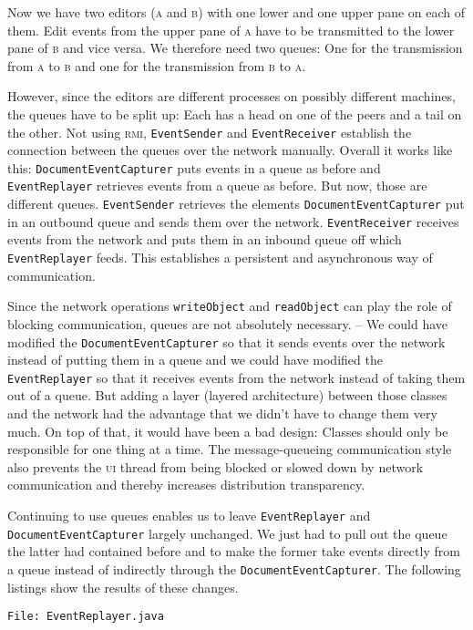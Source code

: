 \documentclass[a4paper,draft,12pt,oneside,article,table]{memoir}
\newcommand{\srcpath}{../ex09/src/main/java/ddist}
\newcommand{\inmnt}[3]{\vspace{1em}\noindent\texttt{\color{gray}File: #3}\vspace{-1em}\inputminted[tabsize=4,firstline=#1,firstnumber=#1,lastline=#2,linenos]{java}{\srcpath/#3}}
\newcommand{\mil}[1]{\texttt{#1}}
\begin{document}
Now we have two editors (\textsc{a} and \textsc{b}) with one lower and
one upper pane on each of them. Edit events from the upper pane of
\textsc{a} have to be transmitted to the lower pane of \textsc{b} and
vice versa. We therefore need two queues: One for the transmission
from \textsc{a} to \textsc{b} and one for the transmission from
\textsc{b} to \textsc{a}.

However, since the editors are different processes on possibly
different machines, the queues have to be split up: Each has a head on
one of the peers and a tail on the other.  Not using \textsc{rmi},
\mil{EventSender} and \mil{EventReceiver} establish the connection
between the queues over the network manually. Overall it works like
this: \mil{DocumentEventCapturer} puts events in a queue as before and
\mil{EventReplayer} retrieves events from a queue as before. But
now, those are different queues.  \mil{EventSender} retrieves the
elements \mil{DocumentEventCapturer} put in an outbound queue and
sends them over the network.  \mil{EventReceiver} receives events from
the network and puts them in an inbound queue off which
\mil{EventReplayer} feeds. This establishes a persistent and
asynchronous way of communication.

Since the network operations \mil{writeObject} and \mil{readObject} can
play the role of blocking communication, queues are not absolutely
necessary. -- We could have modified the \mil{DocumentEventCapturer} so
that it sends events over the network instead of putting them in a queue
and we could have modified the \mil{EventReplayer} so that it receives
events from the network instead of taking them out of a queue. But
adding a layer (layered architecture) between those classes and the
network had the advantage that we didn't have to change them very much.
On top of that, it would have been a bad design: Classes should only be
responsible for one thing at a time. The message-queueing communication
style also prevents the \textsc{ui} thread from being blocked or slowed
down by network communication and thereby increases distribution
transparency.

Continuing to use queues enables us to leave \mil{EventReplayer} and
\mil{DocumentEventCapturer} largely unchanged. We just had to pull out
the queue the latter had contained before and to make the former take
events directly from a queue instead of indirectly through the
\mil{DocumentEventCapturer}. The following listings show the results of
these changes.

\inmnt{1}{1000}{EventReplayer.java}
\end{document}
